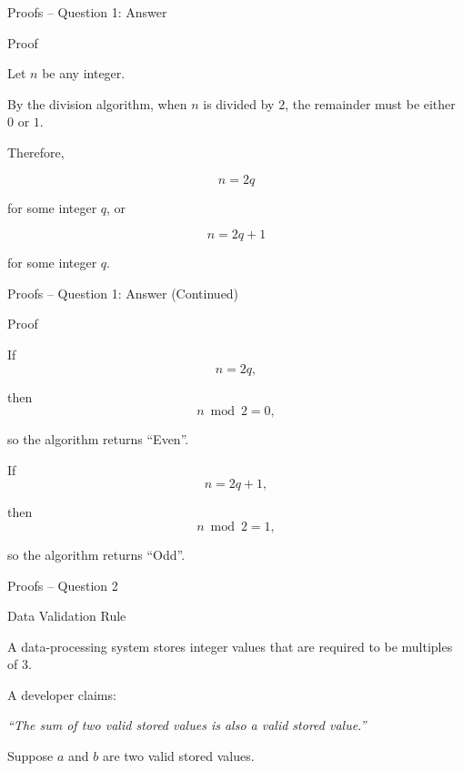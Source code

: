 
\begin{frame}{Proofs -- Question 1: Answer}

\begin{exampleblock}{Proof}

Let $n$ be any integer.

By the division algorithm, when $n$ is divided by $2$, the remainder must
be either $0$ or $1$.

Therefore,

\[
n=2q
\]

for some integer $q$, or

\[
n=2q+1
\]

for some integer $q$.

\end{exampleblock}

\end{frame}


\begin{frame}{Proofs -- Question 1: Answer (Continued)}

\begin{exampleblock}{Proof}

If
\[
n=2q,
\]

then
\[
n\bmod 2=0,
\]

so the algorithm returns ``Even''.

\medskip

If
\[
n=2q+1,
\]

then
\[
n\bmod 2=1,
\]

so the algorithm returns ``Odd''.

\end{exampleblock}

\end{frame}



\begin{frame}{Proofs -- Question 2}

\begin{block}{Data Validation Rule}

A data-processing system stores integer values that are required to be
multiples of $3$.

A developer claims:

\begin{center}
\textit{``The sum of two valid stored values is also a valid stored value.''}
\end{center}

Suppose $a$ and $b$ are two valid stored values.

\end{block}

\end{frame}

